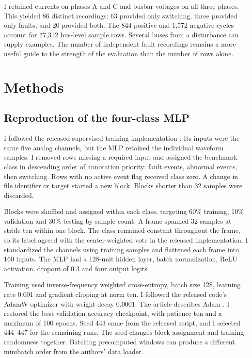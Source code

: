 \documentclass[11pt,conference,letterpaper]{IEEEtran}
\begin{document}
I retained currents on phases A and C and busbar voltages on all three phases. This yielded 86 distinct recordings: 63 provided only switching, three provided only faults, and 20 provided both. The 844 positive and 1,572 negative cycles account for 77,312 bus-level sample rows. Several buses from a disturbance can supply examples. The number of independent fault recordings remains a more useful guide to the strength of the evaluation than the number of rows alone.

\section{Methods}
\subsection{Reproduction of the four-class MLP}
I followed the released supervised training implementation \cite{code}. Its inputs were the same five analog channels, but the MLP retained the individual waveform samples. I removed rows missing a required input and assigned the benchmark class in descending order of annotation priority: fault events, abnormal events, then switching. Rows with no active event flag received class zero. A change in file identifier or target started a new block. Blocks shorter than 32 samples were discarded.

Blocks were shuffled and assigned within each class, targeting 60\% training, 10\% validation and 30\% testing by sample count. A frame spanned 32 samples at stride ten within one block. The class remained constant throughout the frame, so its label agreed with the center-weighted vote in the released implementation. I standardized the channels using training samples and flattened each frame into 160 inputs. The MLP had a 128-unit hidden layer, batch normalization, ReLU activation, dropout of 0.3 and four output logits.

Training used inverse-frequency weighted cross-entropy, batch size 128, learning rate 0.001 and gradient clipping at norm ten. I followed the released code's AdamW optimizer with weight decay 0.0001. The article describes Adam \cite{osc,code}. I restored the best validation-accuracy checkpoint, with patience ten and a maximum of 100 epochs. Seed 443 came from the released script, and I selected 444--447 for the remaining runs. The seed changes block assignment and training randomness together. Batching precomputed windows can produce a different minibatch order from the authors' data loader.
\end{document}
